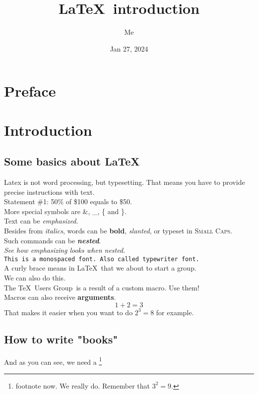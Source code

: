\documentclass[a4paper, 12pt]{book}
\title{\LaTeX\ introduction}
\author{Me}
\date{Jan 27, 2024}
\newcommand{\TUG}{\TeX\ Users Group}
\newcommand{\kw}[2][\bfseries]{{#1#2}}
\newcommand{\im}[1]{{\(#1\)}}
\newcommand{\cm}[1]{{\[#1\]}} %
\begin{document}
\maketitle
\tableofcontents
\chapter*{Preface}
\blindtext[20]
\chapter{Introduction}
\section{Some basics about \LaTeX}
Latex is not word processing, but typesetting. That means you have to provide precise instructions with text.\\
Statement \#1:
50\% of \$100 equals to \$50.\\
More special symbols are \&, \_, \{ and \}.\\
Text can be \emph{emphasized.}\\
Besides from \textit{italics}, words can be \textbf{bold}, \textsl{slanted}, or typeset in \textsc{Small Caps}.\\
Such commands can be \textit{\textbf{nested}}.\\
\emph{See how \emph{emphasizing} looks when nested.}\\ %
\texttt{This is a monospaced font. Also called typewriter font.}\\
A curly brace means in \LaTeX\ that we about to start a group.\\ 
\tiny We \scriptsize can \footnotesize also \small do \normalsize this.\\
The \TUG\ is a result of a custom macro. Use them!\\
Macros can also receive \kw{arguments}.
\cm{1+2=3}
That makes it easier when you want to do \im{2^3=8} for example.
\newpage
\section{How to write "books"}
\blindtext[20]
And as you can see, we need a \footnote{footnote now. We really do. Remember that \im{3^2 = 9}.}
\newpage
\end{document}
